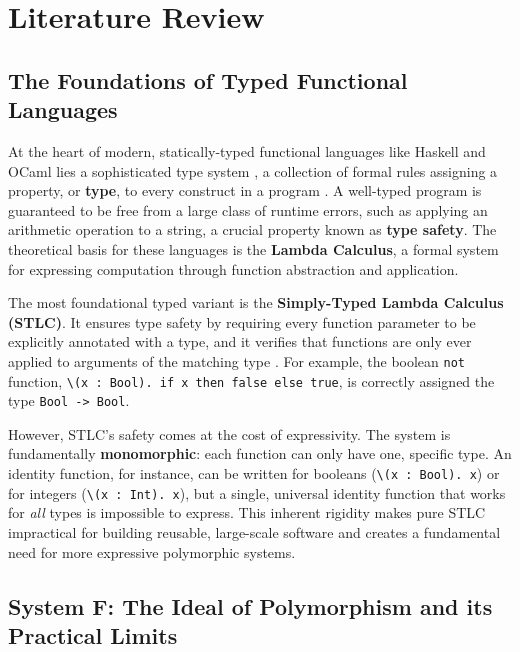 \chapter{Literature Review}
\label{chap:LiteratureReview}

\section{The Foundations of Typed Functional Languages}
\label{sec:LitReviewFoundations}

At the heart of modern, statically-typed functional languages like Haskell and OCaml lies a sophisticated type system \cite{haskell-type-systems-research, ocaml-papers}, a collection of formal rules assigning a property, or \textbf{type}, to every construct in a program \cite{pierce-types-2002}. A well-typed program is guaranteed to be free from a large class of runtime errors, such as applying an arithmetic operation to a string, a crucial property known as \textbf{type safety}. The theoretical basis for these languages is the \textbf{Lambda Calculus}, a formal system for expressing computation through function abstraction and application.

The most foundational typed variant is the \textbf{Simply-Typed Lambda Calculus (STLC)}. It ensures type safety by requiring every function parameter to be explicitly annotated with a type, and it verifies that functions are only ever applied to arguments of the matching type \cite{Pierce-SF2}. For example, the boolean \texttt{not} function, \texttt{\textbackslash(x : Bool). if x then false else true}, is correctly assigned the type \texttt{Bool -> Bool}.

However, STLC's safety comes at the cost of expressivity. The system is fundamentally \textbf{monomorphic}: each function can only have one, specific type. An identity function, for instance, can be written for booleans (\texttt{\textbackslash(x~:~Bool).~x}) or for integers (\texttt{\textbackslash(x~:~Int).~x}), but a single, universal identity function that works for \textit{all} types is impossible to express. This inherent rigidity makes pure STLC impractical for building reusable, large-scale software and creates a fundamental need for more expressive polymorphic systems.

\section{System F: The Ideal of Polymorphism and its Practical Limits}
\label{chap:LiteratureReview:sec:PolymorphismAndSystemF}

